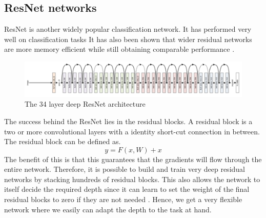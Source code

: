\documentclass{kththesis}
\begin{document}
\subsection{ResNet networks}
ResNet is another widely popular classification network. It has performed very well on classification tasks \parencite{he_identity_2016, szegedy_inception-v4_2016} It has also been shown that wider residual networks are more memory efficient while still obtaining comparable performance \parencite{wu_wider_2016, zagoruyko_wide_2016}.
\begin{figure}[H]
  \centering
      \includegraphics[scale=0.25]{resnet}
  \caption{The 34 layer deep ResNet architecture \parencite{simonyan_very_2014}} \label{fig:vgg}
\end{figure}
\noindent The success behind the ResNet lies in the residual blocks. A residual block is a two or more convolutional layers with a identity short-cut connection in between. The residual block can be defined as.
\begin{equation}
y=F(x, W) + x
\end{equation}
The benefit of this is that this guarantees that the gradients will flow through the entire network. Therefore, it is possible to build and train very deep residual networks by stacking hundreds of residual blocks. This also allows the network to itself decide the required depth since it can learn to set the weight of the final residual blocks to zero if they are not needed \parencite{he_deep_2015}. Hence, we get a very flexible network where we easily can adapt the depth to the task at hand.
\end{document}
